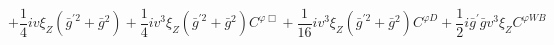 %
\begin{dmath*}
%
  +  \frac{1}{4} i v \xi_Z \left({\bar g}^{\prime 2} + {\bar g}{}^2\right)  +  \frac{1}{4} i v^3 \xi_Z\left({\bar g}^{\prime 2} + {\bar g}{}^2\right) C^{ \varphi  \Box}  +  \frac{1}{16} i v^3 \xi_Z\left({\bar g}^{\prime 2} + {\bar g}{}^2\right) C^{ \varphi  D}  +  \frac{1}{2} i {\bar g}^\prime {\bar g}{} v^3 \xi_ZC^{ \varphi  WB}
%
\end{dmath*}
%
